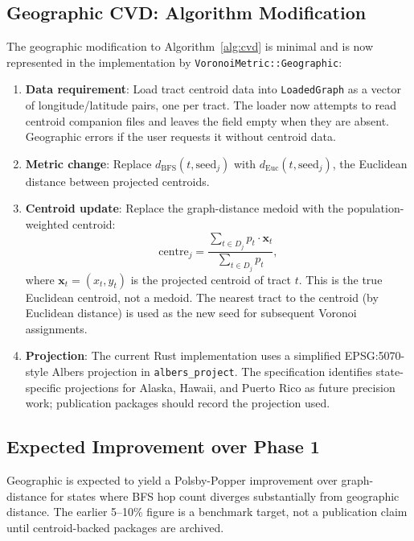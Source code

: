 \subsection{Geographic CVD: Algorithm Modification}

The geographic modification to Algorithm~\ref{alg:cvd} is minimal and is now
represented in the implementation by \texttt{VoronoiMetric::Geographic}:

\begin{enumerate}
\item \textbf{Data requirement}: Load tract centroid data into
  \texttt{LoadedGraph} as a vector of longitude/latitude pairs, one per tract.
  The loader now attempts to read centroid companion files and leaves the field
  empty when they are absent.  Geographic \cvd{} errors if the user requests
  it without centroid data.

\item \textbf{Metric change}: Replace $d_{\mathrm{BFS}}(t, \mathrm{seed}_j)$
  with $d_{\mathrm{Euc}}(t, \mathrm{seed}_j)$, the Euclidean distance between
  projected centroids.

\item \textbf{Centroid update}: Replace the graph-distance medoid with the
  population-weighted centroid:
  \[
    \mathrm{centre}_j = \frac{\sum_{t \in D_j} p_t \cdot \mathbf{x}_t}
                             {\sum_{t \in D_j} p_t},
  \]
  where $\mathbf{x}_t = (x_t, y_t)$ is the projected centroid of tract $t$.
  This is the true Euclidean centroid, not a medoid.
  The nearest tract to the centroid (by Euclidean distance) is used as the
  new seed for subsequent Voronoi assignments.

\item \textbf{Projection}: The current Rust implementation uses a simplified
  EPSG:5070-style Albers projection in \texttt{albers\_project}.  The
  specification identifies state-specific projections for Alaska, Hawaii, and
  Puerto Rico as future precision work; publication packages should record the
  projection used.
\end{enumerate}

\subsection{Expected Improvement over Phase 1}

Geographic \cvd{} is expected to yield a Polsby-Popper improvement over
graph-distance \cvd{} for states where BFS hop count diverges substantially
from geographic distance.  The earlier 5--10\% figure is a benchmark target,
not a publication claim until centroid-backed packages are archived.

